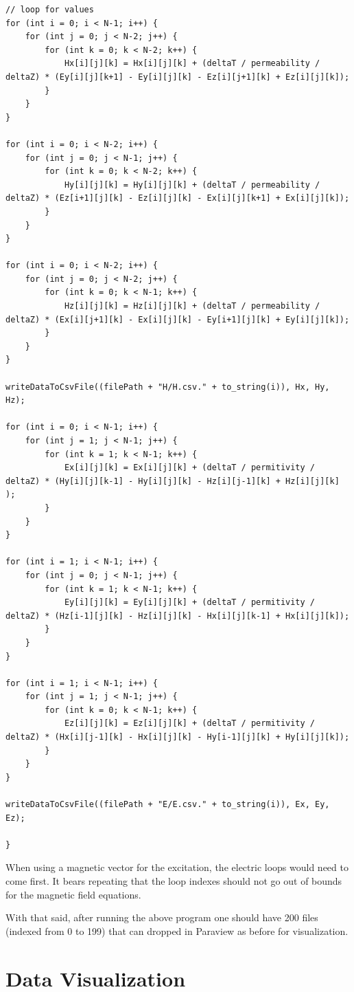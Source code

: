 \begin{verbatim}
// loop for values
for (int i = 0; i < N-1; i++) {
	for (int j = 0; j < N-2; j++) {
		for (int k = 0; k < N-2; k++) {
			Hx[i][j][k] = Hx[i][j][k] + (deltaT / permeability / deltaZ) * (Ey[i][j][k+1] - Ey[i][j][k] - Ez[i][j+1][k] + Ez[i][j][k]);
		}
	}
}

for (int i = 0; i < N-2; i++) {
	for (int j = 0; j < N-1; j++) {
		for (int k = 0; k < N-2; k++) {
			Hy[i][j][k] = Hy[i][j][k] + (deltaT / permeability / deltaZ) * (Ez[i+1][j][k] - Ez[i][j][k] - Ex[i][j][k+1] + Ex[i][j][k]);
		}
	}
}

for (int i = 0; i < N-2; i++) {
	for (int j = 0; j < N-2; j++) {
		for (int k = 0; k < N-1; k++) {
			Hz[i][j][k] = Hz[i][j][k] + (deltaT / permeability / deltaZ) * (Ex[i][j+1][k] - Ex[i][j][k] - Ey[i+1][j][k] + Ey[i][j][k]);
		}
	}
}

writeDataToCsvFile((filePath + "H/H.csv." + to_string(i)), Hx, Hy, Hz);

for (int i = 0; i < N-1; i++) {
	for (int j = 1; j < N-1; j++) {
		for (int k = 1; k < N-1; k++) {
			Ex[i][j][k] = Ex[i][j][k] + (deltaT / permitivity / deltaZ) * (Hy[i][j][k-1] - Hy[i][j][k] - Hz[i][j-1][k] + Hz[i][j][k] );
		}
	}
}

for (int i = 1; i < N-1; i++) {
	for (int j = 0; j < N-1; j++) {
		for (int k = 1; k < N-1; k++) {
			Ey[i][j][k] = Ey[i][j][k] + (deltaT / permitivity / deltaZ) * (Hz[i-1][j][k] - Hz[i][j][k] - Hx[i][j][k-1] + Hx[i][j][k]);
		}
	}
}

for (int i = 1; i < N-1; i++) {
	for (int j = 1; j < N-1; j++) {
		for (int k = 0; k < N-1; k++) {
			Ez[i][j][k] = Ez[i][j][k] + (deltaT / permitivity / deltaZ) * (Hx[i][j-1][k] - Hx[i][j][k] - Hy[i-1][j][k] + Hy[i][j][k]);
		}
	}
}

writeDataToCsvFile((filePath + "E/E.csv." + to_string(i)), Ex, Ey, Ez);

}
\end{verbatim}

When using a magnetic vector for the excitation, the electric loops would need to come first. It bears repeating that the loop indexes should not go out of bounds for the magnetic field equations.

With that said, after running the above program one should have 200 files (indexed from 0 to 199) that can dropped in Paraview as before for visualization.

\section{Data Visualization}

